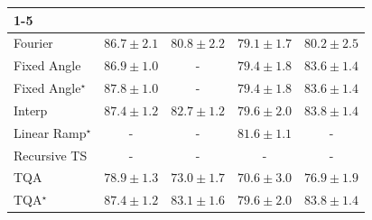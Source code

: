 \begin{tabular}{l|cccc|}
\cline{1-5}
\multicolumn{5}{c}{\rule{0pt}{8pt}PP} \\
\midrule
Fourier & {\cellcolor[HTML]{005931}} \color[HTML]{F1F1F1} $86.7\pm 2.1$ & {\cellcolor[HTML]{3BA358}} \color[HTML]{F1F1F1} $80.8\pm 2.2$ & {\cellcolor[HTML]{5AB76A}} \color[HTML]{F1F1F1} $79.1\pm 1.7$ & {\cellcolor[HTML]{43AC5E}} \color[HTML]{F1F1F1} $80.2\pm 2.5$ \\
Fixed Angle & {\cellcolor[HTML]{005530}} \color[HTML]{F1F1F1} $86.9\pm 1.0$ & {\cellcolor[HTML]{000000}} \color[HTML]{F1F1F1} {\cellcolor{white}} \color{black} - & {\cellcolor[HTML]{53B466}} \color[HTML]{F1F1F1} $79.4\pm 1.8$ & {\cellcolor[HTML]{197C40}} \color[HTML]{F1F1F1} $83.6\pm 1.4$ \\
Fixed Angle$^\star$ & {\cellcolor[HTML]{00492B}} \color[HTML]{F1F1F1} $87.8\pm 1.0$ & {\cellcolor[HTML]{000000}} \color[HTML]{F1F1F1} {\cellcolor{white}} \color{black} - & {\cellcolor[HTML]{53B466}} \color[HTML]{F1F1F1} $79.4\pm 1.8$ & {\cellcolor[HTML]{197C40}} \color[HTML]{F1F1F1} $83.6\pm 1.4$ \\
Interp & {\cellcolor[HTML]{004F2D}} \color[HTML]{F1F1F1} $87.4\pm 1.2$ & {\cellcolor[HTML]{258745}} \color[HTML]{F1F1F1} $82.7\pm 1.2$ & {\cellcolor[HTML]{4FB264}} \color[HTML]{F1F1F1} $79.6\pm 2.0$ & {\cellcolor[HTML]{177B3F}} \color[HTML]{F1F1F1} $83.8\pm 1.4$ \\
Linear Ramp$^\star$ & {\cellcolor[HTML]{000000}} \color[HTML]{F1F1F1} {\cellcolor{white}} \color{black} - & {\cellcolor[HTML]{000000}} \color[HTML]{F1F1F1} {\cellcolor{white}} \color{black} - & {\cellcolor[HTML]{329850}} \color[HTML]{F1F1F1} $81.6\pm 1.1$ & {\cellcolor[HTML]{000000}} \color[HTML]{F1F1F1} {\cellcolor{white}} \color{black} - \\
Recursive TS & {\cellcolor[HTML]{000000}} \color[HTML]{F1F1F1} {\cellcolor{white}} \color{black} - & {\cellcolor[HTML]{000000}} \color[HTML]{F1F1F1} {\cellcolor{white}} \color{black} - & {\cellcolor[HTML]{000000}} \color[HTML]{F1F1F1} {\cellcolor{white}} \color{black} - & {\cellcolor[HTML]{000000}} \color[HTML]{F1F1F1} {\cellcolor{white}} \color{black} - \\
TQA & {\cellcolor[HTML]{5DB96B}} \color[HTML]{F1F1F1} $78.9\pm 1.3$ & {\cellcolor[HTML]{CFEC9E}} \color[HTML]{000000} $73.0\pm 1.7$ & {\cellcolor[HTML]{EDF8B2}} \color[HTML]{000000} $70.6\pm 3.0$ & {\cellcolor[HTML]{88CD7F}} \color[HTML]{000000} $76.9\pm 1.9$ \\
TQA$^\star$ & {\cellcolor[HTML]{004F2D}} \color[HTML]{F1F1F1} $87.4\pm 1.2$ & {\cellcolor[HTML]{208242}} \color[HTML]{F1F1F1} $83.1\pm 1.6$ & {\cellcolor[HTML]{4FB264}} \color[HTML]{F1F1F1} $79.6\pm 2.0$ & {\cellcolor[HTML]{177B3F}} \color[HTML]{F1F1F1} $83.8\pm 1.4$ \\

\end{tabular}
